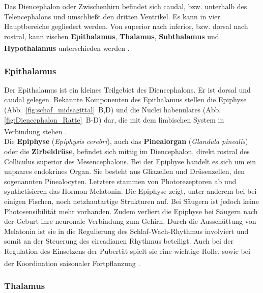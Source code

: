 \documentclass[12pt,a4paper,pdftex]{article}
\begin{document}
Das Diencephalon oder Zwischenhirn befindet sich caudal, bzw. unterhalb des Telencephalons und umschließt den dritten Ventrikel. Es kann in vier Hauptbereiche gegliedert werden. Von superior nach inferior, bzw. dorsal nach rostral, kann zischen \textbf{Epithalamus}, \textbf{Thalamus}, \textbf{Subthalamus}  und \textbf{Hypothalamus} unterschieden werden \textsuperscript{\cite[16]{crossman2014neuroanatomy}}.

\subsubsection{Epithalamus}
\label{subsubsec:Epithalamus} 

Der Epithalamus ist ein kleines Teilgebiet des Diencephalons. Er ist dorsal und caudal gelegen. Bekannte Komponenten des Epithalamus stellen die Epiphyse (Abb.~\ref{fig:schaf_midsagittal}~B,D) und die Nuclei habenulares (Abb.\ref{fig:Diencephalon_Ratte}~B-D) dar, die mit dem limbischen System in Verbindung stehen \textsuperscript{\cite[12]{crossman2014neuroanatomy}}.\\

\noindent Die \textbf{Epiphyse} (\textit{Epiphysis cerebri}), auch das \textbf{Pinealorgan} (\textit{Glandula pinealis}) oder die \textbf{Zirbeldrüse}, befindet sich mittig im Diencephalon, direkt rostral des Colliculus superior des Mesencephalons. Bei der Epiphyse handelt es sich um ein unpaares endokrines Organ.
Sie besteht aus Gliazellen und Drüsenzellen, den sogenannten Pinealocyten. Letztere stammen von Photorezeptoren ab und synthetisieren das Hormon Melatonin. Die Epiphyse zeigt, unter anderem  bei bei einigen Fischen, noch netzhautartige Strukturen auf. Bei Säugern ist jedoch keine Photosensibilität mehr vorhanden. Zudem verliert die Epiphyse bei Säugern nach der Geburt ihre neuronale Verbindung zum Gehirn. Durch die Ausschüttung von Melatonin ist sie in die Regulierung des Schlaf-Wach-Rhythmus involviert und somit an der Steuerung des circadianen Rhythmus beteiligt. Auch bei der Regulation des Einsetzens der Pubertät spielt sie eine wichtige Rolle, sowie bei der Koordination saisonaler Fortpflanzung \textsuperscript{\cite[13]{penzlin2005tierphys}}.

\subsubsection{Thalamus}
\label{subsubsec:Thalamus} 
\end{document}
